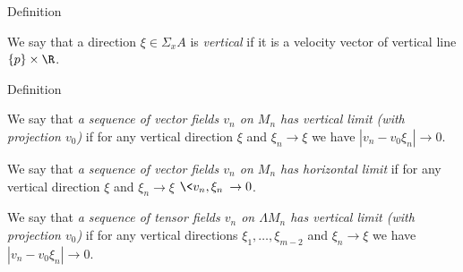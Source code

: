 \begin{thm}{Definition}

We say that a direction $\xi\in \Sigma_xA$ is \emph {vertical }
if it is a velocity vector of vertical line $\{p\}\times \R$.
\end{thm}

\begin{thm}{Definition}

We say that \emph {a sequence of vector fields $v_n$ on $M_n$  has vertical limit
(with projection $v_0$) } if for any vertical direction $\xi$ and 
$\xi_n\to\xi$
we have $|v_n-v_0\xi_n|\to 0 $.


We say that \emph {a sequence of vector fields $v_n$ on $M_n$  has horizontal limit}
if for any vertical direction $\xi$ and 
$\xi_n\to\xi$
$\<v_n,\xi_n\>\to 0$.

We say that \emph {a sequence of tensor fields $v_n$ on $\Lambda M_n$  has vertical limit
(with projection $v_0$)} if for any vertical directions $\xi_1,\dots,\xi_{m-2}$ and 
$\xi_n\to\xi$
we have $|v_n-v_0\xi_n|\to 0 $.


\end{thm}

